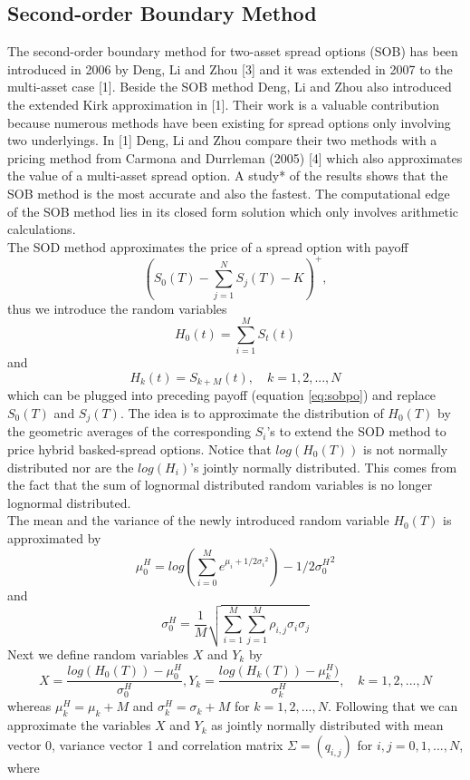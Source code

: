 \documentclass[a4paper]{article}
\begin{document}
\subsection{Second-order Boundary Method}
\label{sec:sob}
The second-order boundary method for two-asset spread options (SOB) has been introduced in 2006 by Deng, Li and Zhou [3] and it was extended in 2007 to the multi-asset case [1]. Beside the SOB method Deng, Li and Zhou also introduced the extended Kirk approximation in [1]. Their work is a valuable contribution because numerous methods have been existing for spread options only involving two underlyings. In [1] Deng, Li and Zhou compare their two methods with a pricing method from Carmona and Durrleman (2005) [4] which also approximates the value of a multi-asset spread option. A study* of the results shows that the SOB method is the most accurate and also the fastest. The computational edge of the SOB method lies in its closed form solution which only involves arithmetic calculations.\\
The SOD method approximates the price of a spread option with payoff
\begin{equation}
\label{eq:sobpo}
(S_0(T) - \sum_{j=1}^{N}S_j(T) - K)^+, 
\end{equation}
thus we introduce the random variables 
$$H_0(t)=\sum_{i=1}^M S_t(t)$$ 
and 
$$H_k(t)=S_{k+M}(t), \quad k=1,2,...,N$$
which can be plugged into preceding payoff (equation \ref{eq:sobpo}) and replace $S_0(T)$ and $S_j(T)$. The idea is to approximate the distribution of $H_0(T)$ by the geometric averages of the corresponding  $S_i$'s to extend the SOD method to price hybrid basked-spread options. Notice that $log(H_0(T))$ is not normally distributed nor are the $log(H_i)$'s jointly normally distributed. This comes from the fact that the sum of lognormal distributed random variables is no longer lognormal distributed.\\
The mean and the variance of the newly introduced random variable $H_0(T)$ is approximated by 
$$\mu_0^H = log(\sum_{i=0}^{M}e^{\mu_i+1/2{\sigma_i}^2}) - 1/2{\sigma_0^H}^2$$ 
and 
$$\sigma_0^H=\frac{1}{M}\sqrt{\sum_{i=1}^M \sum_{j=1}^M \rho_{i,j} \sigma_i \sigma_j}$$
Next we define random variables $X$ and $Y_k$ by
$$X = \frac{log(H_0(T))-\mu_0^H}{\sigma_0^H}, Y_k = \frac{log(H_k(T))-\mu_k^H)}{\sigma_k^H}, \quad k=1,2,...,N$$
whereas $\mu_k^H = \mu_k+M$ and $\sigma_k^H = \sigma_k+M$ for $k=1,2,...,N$. Following that we can approximate the variables $X$ and $Y_k$ as jointly normally distributed with mean vector 0, variance vector 1 and correlation matrix $\Sigma = (q_{i,j})$ for $i,j=0,1,...,N$, where 
\end{document}
